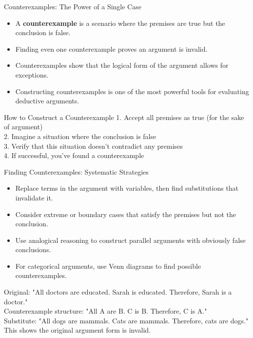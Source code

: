 \documentclass{beamer}
\begin{document}
\begin{frame}{Counterexamples: The Power of a Single Case}
    \begin{itemize}
        \item A \textbf{counterexample} is a scenario where the premises are true but the conclusion is false.
        \item Finding even one counterexample proves an argument is invalid.
        \item Counterexamples show that the logical form of the argument allows for exceptions.
        \item Constructing counterexamples is one of the most powerful tools for evaluating deductive arguments.
    \end{itemize}
    
    \begin{alertblock}{How to Construct a Counterexample}
        1. Accept all premises as true (for the sake of argument)\\
        2. Imagine a situation where the conclusion is false\\
        3. Verify that this situation doesn't contradict any premises\\
        4. If successful, you've found a counterexample
    \end{alertblock}
\end{frame}

\begin{frame}{Finding Counterexamples: Systematic Strategies}
    \begin{itemize}
        \item Replace terms in the argument with variables, then find substitutions that invalidate it.
        \item Consider extreme or boundary cases that satisfy the premises but not the conclusion.
        \item Use analogical reasoning to construct parallel arguments with obviously false conclusions.
        \item For categorical arguments, use Venn diagrams to find possible counterexamples.
    \end{itemize}
    
    \begin{example}
        Original: "All doctors are educated. Sarah is educated. Therefore, Sarah is a doctor."\\
        
        Counterexample structure: "All A are B. C is B. Therefore, C is A."\\
        
        Substitute: "All dogs are mammals. Cats are mammals. Therefore, cats are dogs."\\
        
        This shows the original argument form is invalid.
    \end{example}
\end{frame}
\end{document}
